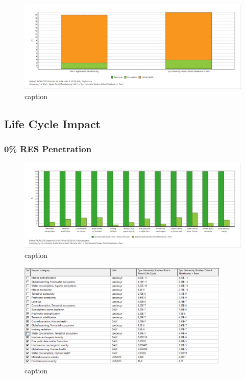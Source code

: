 \begin{figure}[H]
    \centering
    \includegraphics[width=\textwidth]{images/Manufacturing/Single_Score_Manufacturing.JPG}
    \caption{caption}\label{fig:single_score_manufacturing}
\end{figure}


\subsection{Life Cycle Impact}\label{subsec:results_life_cycle}

\subsubsection{0\% RES Penetration}

\begin{figure}[H]
    \centering
    \includegraphics[width=\textwidth]{images/RES_0/Characterization_RES_0.JPG}
    \caption{caption}\label{fig:characterization_RES_0}
\end{figure}

\begin{figure}[H]
    \centering
    \includegraphics[width=0.9\textwidth]{images/RES_0/Characterization_Table_RES_0.PNG}
    \caption{caption}\label{fig:characterization_table_RES_0}
\end{figure}

